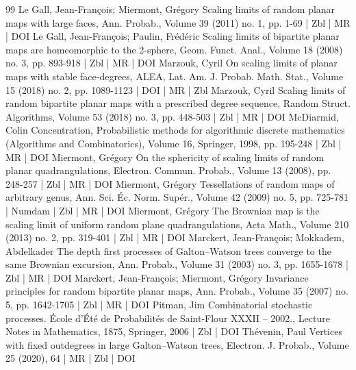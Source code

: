 \begin{thebibliography}{99}
Le Gall, Jean-François; Miermont, Grégory Scaling limits of random planar maps with large faces, Ann. Probab., Volume 39 (2011) no. 1, pp. 1-69 | Zbl | MR | DOI
Le Gall, Jean-François; Paulin, Frédéric Scaling limits of bipartite planar maps are homeomorphic to the 2-sphere, Geom. Funct. Anal., Volume 18 (2008) no. 3, pp. 893-918 | Zbl | MR | DOI
Marzouk, Cyril On scaling limits of planar maps with stable face-degrees, ALEA, Lat. Am. J. Probab. Math. Stat., Volume 15 (2018) no. 2, pp. 1089-1123 | DOI | MR | Zbl
Marzouk, Cyril Scaling limits of random bipartite planar maps with a prescribed degree sequence, Random Struct. Algorithms, Volume 53 (2018) no. 3, pp. 448-503 | Zbl | MR | DOI
McDiarmid, Colin Concentration, Probabilistic methods for algorithmic discrete mathematics (Algorithms and Combinatorics), Volume 16, Springer, 1998, pp. 195-248 | Zbl | MR | DOI
Miermont, Grégory On the sphericity of scaling limits of random planar quadrangulations, Electron. Commun. Probab., Volume 13 (2008), pp. 248-257 | Zbl | MR | DOI
Miermont, Grégory Tessellations of random maps of arbitrary genus, Ann. Sci. Éc. Norm. Supér., Volume 42 (2009) no. 5, pp. 725-781 | Numdam | Zbl | MR | DOI
Miermont, Grégory The Brownian map is the scaling limit of uniform random plane quadrangulations, Acta Math., Volume 210 (2013) no. 2, pp. 319-401 | Zbl | MR | DOI
Marckert, Jean-François; Mokkadem, Abdelkader The depth first processes of Galton–Watson trees converge to the same Brownian excursion, Ann. Probab., Volume 31 (2003) no. 3, pp. 1655-1678 | Zbl | MR | DOI
Marckert, Jean-François; Miermont, Grégory Invariance principles for random bipartite planar maps, Ann. Probab., Volume 35 (2007) no. 5, pp. 1642-1705 | Zbl | MR | DOI
Pitman, Jim Combinatorial stochastic processes. École d’Été de Probabilités de Saint-Flour XXXII – 2002., Lecture Notes in Mathematics, 1875, Springer, 2006 | Zbl | DOI
Thévenin, Paul Vertices with fixed outdegrees in large Galton–Watson trees, Electron. J. Probab., Volume 25 (2020), 64 | MR | Zbl | DOI
\end{thebibliography}

